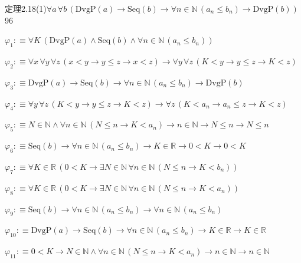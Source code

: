 \begin{fullproof}{定理2.18(1)}{$\forall a\,\forall b\,(\mathrm{DvgP}(a) \to \mathrm{Seq}(b) \to \forall n \in \mathbb{N}\,(a_{n} \leq b_{n}) \to \mathrm{DvgP}(b))$}{96}
\begin{ptree}
\noLine
{}
\noLine
{}
\end{ptree}
\begin{abbrevlist}
\item $\varphi_{1} :\equiv \forall K\,(\mathrm{DvgP}(a) \land \mathrm{Seq}(b) \land \forall n \in \mathbb{N}\,(a_{n} \leq b_{n}))$
\item $\varphi_{2} :\equiv \forall x\,\forall y\,\forall z\,(x < y \to y \leq z \to x < z) \to \forall y\,\forall z\,(K < y \to y \leq z \to K < z)$
\item $\varphi_{3} :\equiv \mathrm{DvgP}(a) \to \mathrm{Seq}(b) \to \forall n \in \mathbb{N}\,(a_{n} \leq b_{n}) \to \mathrm{DvgP}(b)$
\item $\varphi_{4} :\equiv \forall y\,\forall z\,(K < y \to y \leq z \to K < z) \to \forall z\,(K < a_{n} \to a_{n} \leq z \to K < z)$
\item $\varphi_{5} :\equiv N \in \mathbb{N} \land \forall n \in \mathbb{N}\,(N \leq n \to K < a_{n}) \to n \in \mathbb{N} \to N \leq n \to N \leq n$
\item $\varphi_{6} :\equiv \mathrm{Seq}(b) \to \forall n \in \mathbb{N}\,(a_{n} \leq b_{n}) \to K \in \mathbb{R} \to 0 < K \to 0 < K$
\item $\varphi_{7} :\equiv \forall K \in \mathbb{R}\,(0 < K \to \exists N \in \mathbb{N}\,\forall n \in \mathbb{N}\,(N \leq n \to K < b_{n}))$
\item $\varphi_{8} :\equiv \forall K \in \mathbb{R}\,(0 < K \to \exists N \in \mathbb{N}\,\forall n \in \mathbb{N}\,(N \leq n \to K < a_{n}))$
\item $\varphi_{9} :\equiv \mathrm{Seq}(b) \to \forall n \in \mathbb{N}\,(a_{n} \leq b_{n}) \to \forall n \in \mathbb{N}\,(a_{n} \leq b_{n})$
\item $\varphi_{10} :\equiv \mathrm{DvgP}(a) \to \mathrm{Seq}(b) \to \forall n \in \mathbb{N}\,(a_{n} \leq b_{n}) \to K \in \mathbb{R} \to K \in \mathbb{R}$
\item $\varphi_{11} :\equiv 0 < K \to N \in \mathbb{N} \land \forall n \in \mathbb{N}\,(N \leq n \to K < a_{n}) \to n \in \mathbb{N} \to n \in \mathbb{N}$

\end{abbrevlist}
\end{fullproof}
